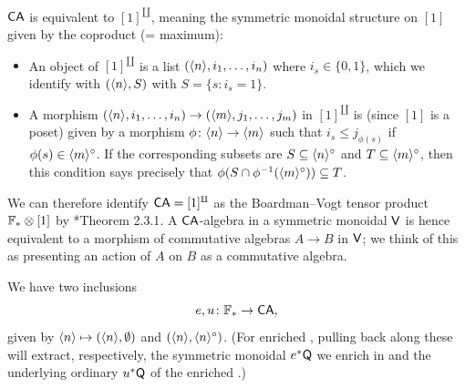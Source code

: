 \documentclass[a4paper,11pt]{article}
\begin{document}
\begin{observation}
  $\textup{\textsf{CA}}$ is equivalent to $[1]^{\amalg}$, meaning the symmetric
  monoidal structure on $[1]$ given by the coproduct (= maximum):
  \begin{itemize}
  \item An object of $[1]^{\amalg}$ is a
    list $(\langle n \rangle, i_{1},\ldots,i_{n})$ where $i_{s} \in \{0,1\}$,
    which we identify with $(\langle n \rangle, S)$ with $S = \{s : i_{s} =
    1\}$.
  \item A morphism $(\angled{n},
    i_{1},\ldots,i_{n}) \to (\angled{m}, j_{1},\ldots,j_{m})$ in
    $[1]^{\amalg}$ is (since $[1]$ is a poset) given by a
    morphism $\phi \colon \angled{n} \to \angled{m}$ such that $i_{s}
    \leq j_{\phi(s)}$ if $\phi(s) \in \langle m \rangle^{\circ}$. If the
    corresponding subsets are $S \subseteq \langle n \rangle^{\circ}$ and $T
    \subseteq \langle m \rangle^{\circ}$, then this condition says precisely
    that $\phi(S \cap \phi^{-1}(\langle m \rangle^{\circ})) \subseteq T$.
  \end{itemize}
\end{observation}
We can therefore identify $\textup{\textsf{CA}} = [1]^{\amalg}$ as the Boardman--Vogt
tensor product $\mathbb{F}_{*}\otimes [1]$ by \cite{HinichBVTens}*{Theorem
  2.3.1}. A $\textup{\textsf{CA}}$-algebra in a symmetric monoidal \icat{} $\textup{\textsf{V}}$ is
hence equivalent to a morphism of commutative algebras $A \to B$
in $\textup{\textsf{V}}$; we think of this as presenting an action of $A$ on $B$ as a
commutative algebra.


\begin{notation}
  We have two inclusions
  \[ e,u \colon \xF_{*} \to \CA,\] given by
  $\langle n \rangle \mapsto (\langle n \rangle, \emptyset)$ and
  $(\langle n \rangle, \langle n \rangle^{\circ})$. (For enriched \iopds{}, pulling
  back along these
  will extract, respectively, the symmetric monoidal \icat{}
  $e^{*}\textup{\textsf{Q}}$ we enrich in and the underlying ordinary \iopd{}
  $u^{*}\textup{\textsf{Q}}$ of the enriched \iopd{}.) 
\end{notation}
\end{document}
